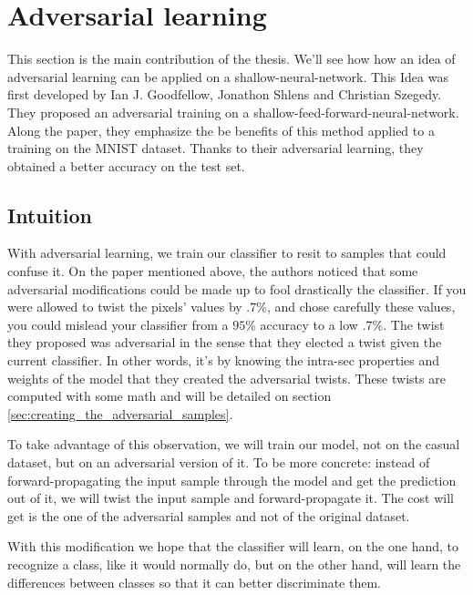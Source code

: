 


\section{Adversarial learning}
\label{sec:adversarial_learning}

	This section is the main contribution of the thesis. We'll see how how an idea of adversarial learning can be applied on a shallow-neural-network. This Idea was first developed by Ian J. Goodfellow, Jonathon Shlens and Christian Szegedy. They proposed an adversarial training on a shallow-feed-forward-neural-network. Along the paper\cite{goodfellow2014explaining}, they emphasize the be benefits of this method applied to a training on the MNIST dataset\cite{lecun-mnist}. Thanks to their adversarial learning, they obtained a better accuracy on the test set.


	
	\subsection{Intuition}
	\label{sub:intuition}
		With adversarial learning, we train our classifier to resit to samples that could confuse it. On the paper mentioned above\cite{goodfellow2014explaining}, the authors noticed that some adversarial modifications could be made up to fool drastically the classifier. If you were allowed to twist the pixels' values by $.7\%$, and chose carefully these values, you could mislead your classifier from a $95\%$ accuracy to a low $.7\%$. The twist they proposed was adversarial in the sense that they elected a twist given the current classifier. In other words, it's by knowing the intra-sec properties and weights of the model that they created the adversarial twists. These twists are computed with some math and will be detailed on section \ref{sec:creating_the_adversarial_samples}.

		To take advantage of this observation, we will train our model, not on the casual dataset, but on an adversarial version of it. To be more concrete: instead of forward-propagating the input sample through the model and get the prediction out of it, we will twist the input sample and forward-propagate it. The cost will get is the one of the adversarial samples and not of the original dataset.

		With this modification we hope that the classifier will learn, on the one hand, to recognize a class, like it would normally do, but on the other hand, will learn the differences between classes so that it can better discriminate them. 

